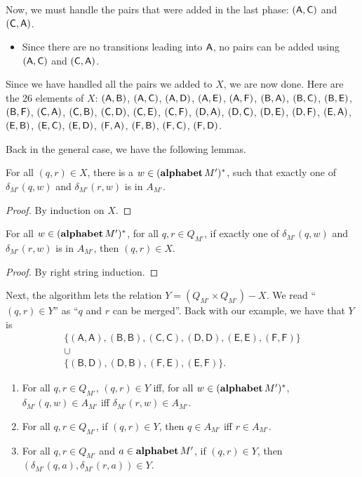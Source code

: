 Now, we must handle the pairs that were added in the last
phase: $(\mathsf{A},\mathsf{C})$ and $(\mathsf{C},\mathsf{A})$.
\begin{itemize}
\item Since there are no transitions leading into $\mathsf{A}$, no pairs can
  be added using $(\mathsf{A},\mathsf{C})$ and $(\mathsf{C},\mathsf{A})$.
\end{itemize}

Since we have handled all the pairs we added to $X$, we are now done.
Here are the 26 elements of $X$: $(\mathsf{A},\mathsf{B})$, $(\mathsf{A},\mathsf{C})$,
$(\mathsf{A},\mathsf{D})$, $(\mathsf{A},\mathsf{E})$, $(\mathsf{A},\mathsf{F})$, $(\mathsf{B},\mathsf{A})$,
$(\mathsf{B},\mathsf{C})$, $(\mathsf{B},\mathsf{E})$, $(\mathsf{B},\mathsf{F})$, $(\mathsf{C},\mathsf{A})$,
$(\mathsf{C},\mathsf{B})$, $(\mathsf{C},\mathsf{D})$, $(\mathsf{C},\mathsf{E})$, $(\mathsf{C},\mathsf{F})$,
$(\mathsf{D},\mathsf{A})$, $(\mathsf{D},\mathsf{C})$, $(\mathsf{D},\mathsf{E})$, $(\mathsf{D},\mathsf{F})$,
$(\mathsf{E},\mathsf{A})$, $(\mathsf{E},\mathsf{B})$, $(\mathsf{E},\mathsf{C})$, $(\mathsf{E},\mathsf{D})$,
$(\mathsf{F},\mathsf{A})$, $(\mathsf{F},\mathsf{B})$, $(\mathsf{F},\mathsf{C})$, $(\mathsf{F},\mathsf{D})$.

Back in the general case, we have the following lemmas.

\begin{lemma}
\label{MinimizationLemma1}
For all $(q,r)\in X$, there is a $w\in(\mathbf{alphabet}\,M')^*$, such that
exactly one of $\delta_{M'}(q,w)$ and $\delta_{M'}(r,w)$ is in $A_{M'}$.
\end{lemma}

\begin{proof}
By induction on $X$.
\end{proof}

\begin{lemma}
\label{MinimizationLemma2}
For all $w\in(\mathbf{alphabet}\,M')^*$, for all $q,r\in Q_{M'}$, if
exactly one of $\delta_{M'}(q,w)$ and $\delta_{M'}(r,w)$ is
in $A_{M'}$, then $(q,r)\in X$.
\end{lemma}

\begin{proof}
By right string induction.
\end{proof}

Next, the algorithm lets the relation $Y=(Q_{M'}\times Q_{M'})-X$.  We
read ``$(q,r)\in Y$'' as ``$q$ and $r$ can be merged''.
Back with our example, we have that $Y$ is
\begin{gather*}
\{\mathsf{(A,A), (B,B), (C,C), (D,D), (E,E), (F,F)}\} \\
\cup \\
\{\mathsf{(B,D), (D,B), (F,E), (E,F)}\} .
\end{gather*}

\begin{lemma}
\label{MinimizationLemma3}
\begin{enumerate}[\quad (1)]
\item For all $q,r\in Q_{M'}$, $(q,r)\in Y$ iff, for all
  $w\in(\mathbf{alphabet}\,M')^*$, $\delta_{M'}(q,w)\in A_{M'}$ iff
  $\delta_{M'}(r,w)\in A_{M'}$.

\item For all $q,r\in Q_{M'}$, if $(q,r)\in Y$, then $q\in A_{M'}$ iff
  $r\in A_{M'}$.

\item For all $q,r\in Q_{M'}$ and $a\in\mathbf{alphabet}\,M'$, if $(q,r)\in
  Y$, then $(\delta_{M'}(q,a),\delta_{M'}(r,a))\in Y$.
\end{enumerate}
\end{lemma}

